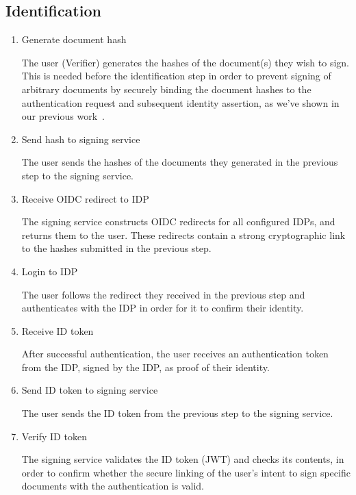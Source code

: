 \subsection{Identification}\label{subsec:identification}
\begin{enumerate}[resume]
    \item Generate document hash

    The user (Verifier) generates the hashes of the document(s) they wish to sign.
    This is needed before the identification step in order to prevent signing of arbitrary documents by securely binding the document hashes to the authentication request and subsequent identity assertion,
    as we've shown in our previous work~\cite{projekt2}.

    \item Send hash to signing service

    The user sends the hashes of the documents they generated in the previous step to the signing service.

    \item Receive \gls{OIDC} redirect to \gls{IDP}

    The signing service constructs \gls{OIDC} redirects for all configured \gls{IDP}s,
    and returns them to the user.
    These redirects contain a strong cryptographic link to the hashes submitted in the previous step.

    \item Login to \gls{IDP}

    The user follows the redirect they received in the previous step and authenticates with the \gls{IDP} in order for it to confirm their identity.

    \item Receive ID token

    After successful authentication, the user receives an authentication token from the \gls{IDP},
    signed by the \gls{IDP}, as proof of their identity.

    \item Send ID token to signing service

    The user sends the ID token from the previous step to the signing service.

    \item Verify ID token

    The signing service validates the ID token (\gls{JWT}) and checks its contents,
    in order to confirm whether the secure linking of the user's intent to sign specific documents with the authentication is valid.
\end{enumerate}


